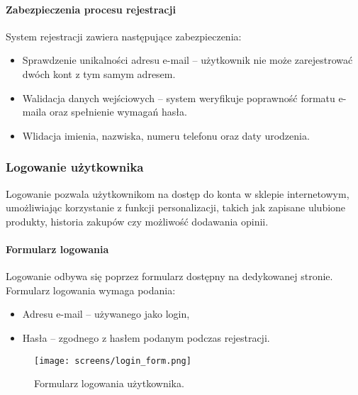\documentclass[12pt,a4paper,oneside]{article}
\theoremstyle{definition}
\numberwithin{equation}{section}
\begin{document}
\paragraph{Zabezpieczenia procesu rejestracji}
System rejestracji zawiera następujące zabezpieczenia:
\begin{itemize}
    \item Sprawdzenie unikalności adresu e-mail – użytkownik nie może zarejestrować dwóch kont z tym samym adresem.
    \item Walidacja danych wejściowych – system weryfikuje poprawność formatu e-maila oraz spełnienie wymagań hasła.
    \item Wlidacja imienia, nazwiska, numeru telefonu oraz daty urodzenia.
\end{itemize}







\subsubsection{Logowanie użytkownika}
Logowanie pozwala użytkownikom na dostęp do konta w sklepie internetowym, umożliwiając korzystanie z funkcji personalizacji, takich jak zapisane ulubione produkty, historia zakupów czy możliwość dodawania opinii.

\paragraph{Formularz logowania}
Logowanie odbywa się poprzez formularz dostępny na dedykowanej stronie. Formularz logowania wymaga podania:
\begin{itemize}
    \item Adresu e-mail – używanego jako login,
    \item Hasła – zgodnego z hasłem podanym podczas rejestracji.
\end{itemize}
\begin{figure}[h!]
    \centering
    \texttt{[image: screens/login\_form.png]}
    \caption{Formularz logowania użytkownika.}
    \label{fig:login_form}
\end{figure}
\end{document}
